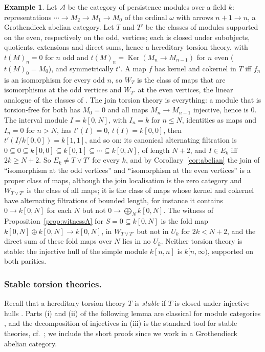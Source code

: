 \documentclass[11pt]{amsart}
\theoremstyle{definition}
\newtheorem{ex}[thm]{Example}
\begin{document}
\begin{ex}\label{ex:persistence}
Let $\mathcal A$ be the category of persistence modules over a field $k$:
representations $\cdots\to M_2\to M_1\to M_0$ of the ordinal $\omega$ with
arrows $n+1\to n$, a Grothendieck abelian category. Let $T$ and $T'$ be the
classes of modules supported on the even, respectively on the odd, vertices;
each is closed under subobjects, quotients, extensions and direct sums,
hence a hereditary torsion theory, with $t(M)_n=0$ for $n$ odd and
$t(M)_n=\operatorname{Ker}(M_n\to M_{n-1})$ for $n$ even ($t(M)_0=M_0$), and
symmetrically $t'$. A map $f$ has kernel and cokernel in $T$ iff $f_n$ is an
isomorphism for every odd $n$, so $W_T$ is the class of maps that are
isomorphisms at the odd vertices and $W_{T'}$ at the even vertices, the
linear analogue of the classes of \cite[Thm.~7.1]{Topjoin}. The join
torsion theory is everything: a module that is torsion-free for both has
$M_0=0$ and all maps $M_n\to M_{n-1}$ injective, hence is $0$. The
interval module $I=k[0,N]$, with $I_n=k$ for $n\le N$, identities as maps
and $I_n=0$ for $n>N$, has $t'(I)=0$, $t(I)=k[0,0]$, then $t'(I/k[0,0])=
k[1,1]$, and so on: its canonical alternating filtration is
$0\subseteq0\subseteq k[0,0]\subseteq k[0,1]\subseteq\cdots\subseteq k[0,N]$,
of length $N+2$, and $I\in E_k$ iff $2k\ge N+2$. So $E_k\ne T\vee T'$ for
every $k$, and by Corollary~\ref{cor:abelian} the join of ``isomorphism at
the odd vertices'' and ``isomorphism at the even vertices'' is a proper
class of maps, although the join localisation is the zero category and
$W_{T\vee T'}$ is the class of all maps; it is the class of maps whose kernel
and cokernel have alternating filtrations of bounded length, for instance
it contains $0\to k[0,N]$ for each $N$ but not $0\to\bigoplus_Nk[0,N]$. The
witness of Proposition~\ref{prop:witnessA} for $S=0\subseteq k[0,N]$ is the
fold map $k[0,N]\oplus k[0,N]\to k[0,N]$, in $W_{T\vee T'}$ but not in
$U_k$ for $2k<N+2$, and the direct sum of these fold maps over $N$ lies in
no $U_k$. Neither torsion theory is stable: the injective hull of the simple
module $k[n,n]$ is $k[n,\infty)$, supported on both parities.
\end{ex}

\subsubsection*{Stable torsion theories.}
Recall that a hereditary torsion theory $T$ is \emph{stable} if $T$ is closed
under injective hulls \cite[Ch.~VI, \S7]{Stenstrom}. Parts (i) and (ii) of
the following lemma are classical for module categories
\cite[Ch.~VI]{Stenstrom}, and the decomposition of injectives in (iii) is
the standard tool for stable theories, cf.\ \cite{Golan76}; we include the
short proofs since we work in a Grothendieck abelian category.
\end{document}
